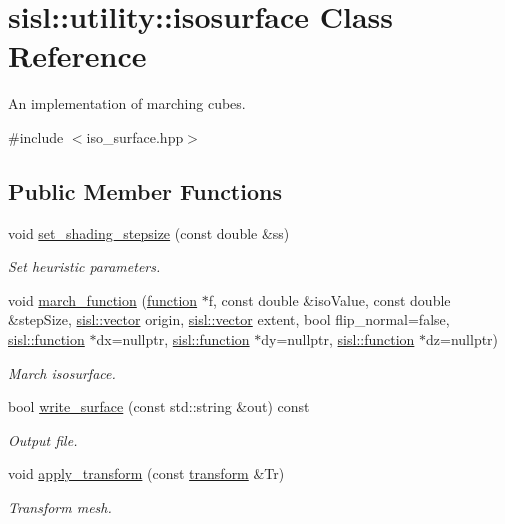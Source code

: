\hypertarget{classsisl_1_1utility_1_1isosurface}{}\section{sisl\+:\+:utility\+:\+:isosurface Class Reference}
\label{classsisl_1_1utility_1_1isosurface}


An implementation of marching cubes.  




{\ttfamily \#include $<$iso\+\_\+surface.\+hpp$>$}

\subsection*{Public Member Functions}
\begin{DoxyCompactItemize}
\item 
void \hyperlink{classsisl_1_1utility_1_1isosurface_a27be7f0e3449d03e955df77e5944d5db}{set\+\_\+shading\+\_\+stepsize} (const double \&ss)
\begin{DoxyCompactList}\small\item\em Set heuristic parameters. \end{DoxyCompactList}\item 
void \hyperlink{classsisl_1_1utility_1_1isosurface_ad81b29590b262cf30286591090eabb13}{march\+\_\+function} (\hyperlink{classsisl_1_1function}{function} $\ast$f, const double \&iso\+Value, const double \&step\+Size, \hyperlink{namespacesisl_a2069bd5374a9be042ff3ce3306d41e1a}{sisl\+::vector} origin, \hyperlink{namespacesisl_a2069bd5374a9be042ff3ce3306d41e1a}{sisl\+::vector} extent, bool flip\+\_\+normal=false, \hyperlink{classsisl_1_1function}{sisl\+::function} $\ast$dx=nullptr, \hyperlink{classsisl_1_1function}{sisl\+::function} $\ast$dy=nullptr, \hyperlink{classsisl_1_1function}{sisl\+::function} $\ast$dz=nullptr)
\begin{DoxyCompactList}\small\item\em March isosurface. \end{DoxyCompactList}\item 
bool \hyperlink{classsisl_1_1utility_1_1isosurface_ada6c1709527aaee83f1d6e616172b1d4}{write\+\_\+surface} (const std\+::string \&out) const
\begin{DoxyCompactList}\small\item\em Output file. \end{DoxyCompactList}\item 
void \hyperlink{classsisl_1_1utility_1_1isosurface_a73bd6c29b9a5a1ff6f34120d2dac5d65}{apply\+\_\+transform} (const \hyperlink{namespacesisl_a2ef12d285ca3e626c05abbdec1f8a679}{transform} \&Tr)
\begin{DoxyCompactList}\small\item\em Transform mesh. \end{DoxyCompactList}\end{DoxyCompactItemize}


